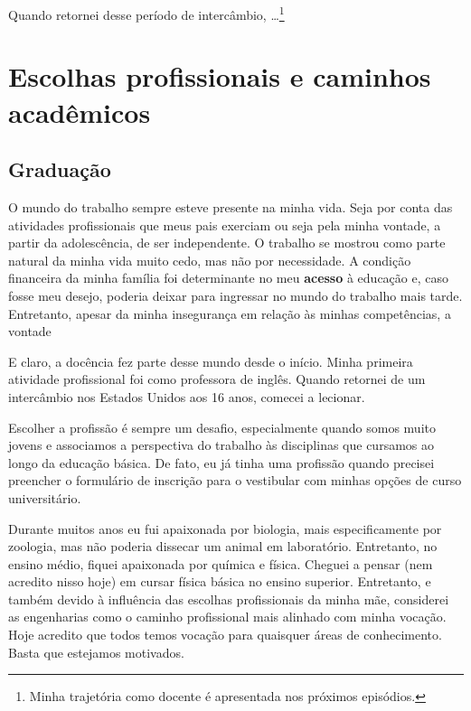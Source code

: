 \documentclass[
]{book}
\begin{document}
Quando retornei desse período de intercâmbio, \ldots{}\footnote{Minha trajetória como docente é apresentada nos próximos episódios.}

\hypertarget{escolhas-profissionais-e-caminhos-acaduxeamicos}{%
\chapter{Escolhas profissionais e caminhos acadêmicos}\label{escolhas-profissionais-e-caminhos-acaduxeamicos}}

\hypertarget{graduauxe7uxe3o}{%
\section{Graduação}\label{graduauxe7uxe3o}}

O mundo do trabalho sempre esteve presente na minha vida. Seja por conta das atividades profissionais que meus pais exerciam ou seja pela minha vontade, a partir da adolescência, de ser independente. O trabalho se mostrou como parte natural da minha vida muito cedo, mas não por necessidade. A condição financeira da minha família foi determinante no meu \textbf{acesso} à educação e, caso fosse meu desejo, poderia deixar para ingressar no mundo do trabalho mais tarde. Entretanto, apesar da minha insegurança em relação às minhas competências, a vontade

E claro, a docência fez parte desse mundo desde o início. Minha primeira atividade profissional foi como professora de inglês. Quando retornei de um intercâmbio nos Estados Unidos aos 16 anos, comecei a lecionar.

Escolher a profissão é sempre um desafio, especialmente quando somos muito jovens e associamos a perspectiva do trabalho às disciplinas que cursamos ao longo da educação básica. De fato, eu já tinha uma profissão quando precisei preencher o formulário de inscrição para o vestibular com minhas opções de curso universitário.

Durante muitos anos eu fui apaixonada por biologia, mais especificamente por zoologia, mas não poderia dissecar um animal em laboratório. Entretanto, no ensino médio, fiquei apaixonada por química e física. Cheguei a pensar (nem acredito nisso hoje) em cursar física básica no ensino superior. Entretanto, e também devido à influência das escolhas profissionais da minha mãe, considerei as engenharias como o caminho profissional mais alinhado com minha vocação. Hoje acredito que todos temos vocação para quaisquer áreas de conhecimento. Basta que estejamos motivados.
\end{document}
